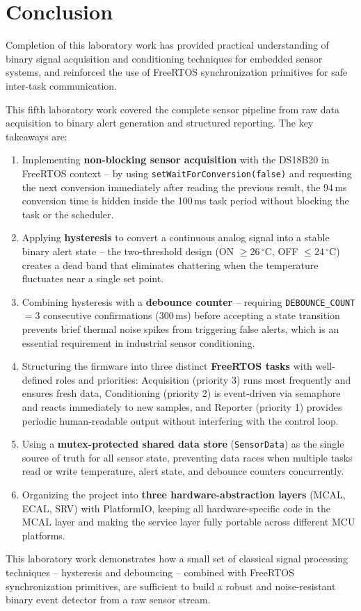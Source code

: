 \section{Conclusion}

Completion of this laboratory work has provided practical understanding of binary signal
acquisition and conditioning techniques for embedded sensor systems, and reinforced the
use of FreeRTOS synchronization primitives for safe inter-task communication.

This fifth laboratory work covered the complete sensor pipeline from raw data acquisition
to binary alert generation and structured reporting. The key takeaways are:

\begin{enumerate}
  \item Implementing \textbf{non-blocking sensor acquisition} with the DS18B20 in
    FreeRTOS context -- by using \texttt{setWaitForConversion(false)} and requesting the
    next conversion immediately after reading the previous result, the 94\,ms conversion
    time is hidden inside the 100\,ms task period without blocking the task or the
    scheduler.
  \item Applying \textbf{hysteresis} to convert a continuous analog signal into a
    stable binary alert state -- the two-threshold design (ON $\geq 26\,^\circ$C, OFF
    $\leq 24\,^\circ$C) creates a dead band that eliminates chattering when the
    temperature fluctuates near a single set point.
  \item Combining hysteresis with a \textbf{debounce counter} -- requiring
    \texttt{DEBOUNCE\_COUNT} $= 3$ consecutive confirmations (300\,ms) before accepting
    a state transition prevents brief thermal noise spikes from triggering false alerts,
    which is an essential requirement in industrial sensor conditioning.
  \item Structuring the firmware into three distinct \textbf{FreeRTOS tasks} with
    well-defined roles and priorities: Acquisition (priority 3) runs most frequently and
    ensures fresh data, Conditioning (priority 2) is event-driven via semaphore and
    reacts immediately to new samples, and Reporter (priority 1) provides periodic
    human-readable output without interfering with the control loop.
  \item Using a \textbf{mutex-protected shared data store} (\texttt{SensorData}) as
    the single source of truth for all sensor state, preventing data races when multiple
    tasks read or write temperature, alert state, and debounce counters concurrently.
  \item Organizing the project into \textbf{three hardware-abstraction layers} (MCAL,
    ECAL, SRV) with PlatformIO, keeping all hardware-specific code in the MCAL layer
    and making the service layer fully portable across different MCU platforms.
\end{enumerate}

This laboratory work demonstrates how a small set of classical signal processing
techniques -- hysteresis and debouncing -- combined with FreeRTOS synchronization
primitives, are sufficient to build a robust and noise-resistant binary event detector
from a raw sensor stream.
